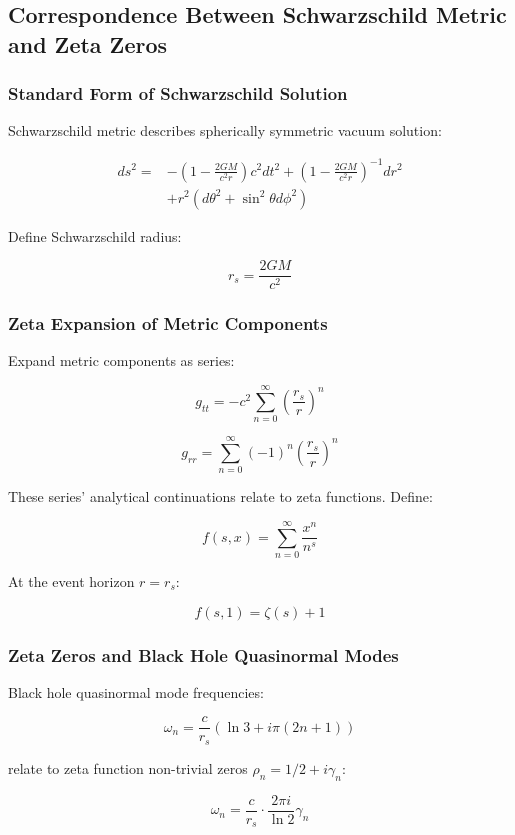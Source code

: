 \documentclass[12pt,a4paper]{article}
\begin{document}
\subsection{Correspondence Between Schwarzschild Metric and Zeta Zeros}

\subsubsection{Standard Form of Schwarzschild Solution}

Schwarzschild metric describes spherically symmetric vacuum solution:

\begin{align}
ds^2 = &-\left(1 - \frac{2GM}{c^2r}\right)c^2dt^2 + \left(1 - \frac{2GM}{c^2r}\right)^{-1}dr^2 \\
&+ r^2(d\theta^2 + \sin^2\theta d\phi^2)
\end{align}

Define Schwarzschild radius:

$$r_s = \frac{2GM}{c^2}$$

\subsubsection{Zeta Expansion of Metric Components}

Expand metric components as series:

$$g_{tt} = -c^2 \sum_{n=0}^{\infty} \left(\frac{r_s}{r}\right)^n$$

$$g_{rr} = \sum_{n=0}^{\infty} (-1)^n \left(\frac{r_s}{r}\right)^n$$

These series' analytical continuations relate to zeta functions. Define:

$$f(s,x) = \sum_{n=0}^{\infty} \frac{x^n}{n^s}$$

At the event horizon $r = r_s$:

$$f(s,1) = \zeta(s) + 1$$

\subsubsection{Zeta Zeros and Black Hole Quasinormal Modes}

Black hole quasinormal mode frequencies:

$$\omega_n = \frac{c}{r_s} \left(\ln 3 + i\pi(2n+1)\right)$$

relate to zeta function non-trivial zeros $\rho_n = 1/2 + i\gamma_n$:

$$\omega_n = \frac{c}{r_s} \cdot \frac{2\pi i}{\ln 2} \gamma_n$$
\end{document}

